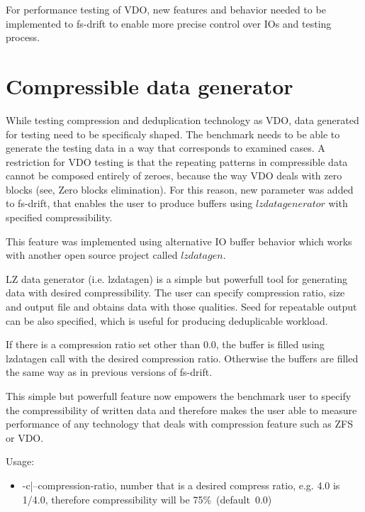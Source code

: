 \documentclass[
  color, %
  table, %
  lof,   %
  lot,   %
]{fithesis3}
\begin{document}
For performance testing of VDO, new features and behavior needed to be implemented to fs-drift to enable more precise control over IOs and testing process.

\section{Compressible data generator}
While testing compression and deduplication technology as VDO, data generated for testing need to be specificaly shaped. The benchmark needs to be able to generate the testing data in a way that corresponds to examined cases. A restriction for VDO testing is that the repeating patterns in compressible data cannot be composed entirely of zeroes, because the way VDO deals with zero blocks (see, Zero blocks elimination). For this reason, new parameter was added to fs-drift, that enables the user to produce buffers using $lzdatagenerator$ with specified compressibility.

This feature was implemented using alternative IO buffer behavior which works with another open source project called $lzdatagen$.

LZ data generator (i.e. lzdatagen) is a simple but powerfull tool for generating data with desired compressibility. The user can specify compression ratio, size and output file and obtains data with those qualities. Seed for repeatable output can be also specified, which is useful for producing deduplicable workload.

If there is a compression ratio set other than 0.0, the buffer is filled using lzdatagen call with the desired compression ratio. Otherwise the buffers are filled the same way as in previous versions of fs-drift.

This simple but powerfull feature now empowers the benchmark user to specify the compressibility of written data and therefore makes the user able to measure performance of any technology that deals with compression feature such as ZFS or VDO.

Usage:
\begin{itemize}
    \item -c|--compression-ratio, number that is a desired compress ratio, e.g. 4.0 is 1/4.0, therefore compressibility will be 75\%~(default~0.0)
\end{itemize}
\end{document}
